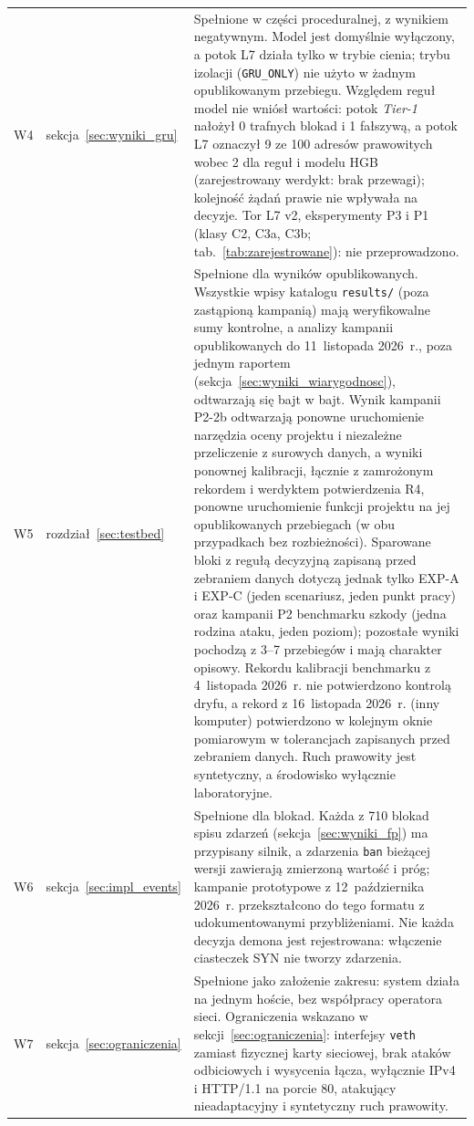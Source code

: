 \documentclass[a4paper,12pt]{article}
\begin{document}
\begin{longtable}{@{}L{0.8cm}L{2.8cm}L{\dimexpr\linewidth-3.6cm-4\tabcolsep\relax}@{}}
W4 & sekcja~\ref{sec:wyniki_gru} & Spełnione w części proceduralnej, z wynikiem negatywnym. Model jest domyślnie wyłączony, a potok L7 działa tylko w trybie cienia; trybu izolacji (\texttt{GRU\_ONLY}) nie użyto w żadnym opublikowanym przebiegu. Względem reguł model nie wniósł wartości: potok \textit{Tier-1} nałożył 0 trafnych blokad i 1 fałszywą, a potok L7 oznaczył 9 ze 100 adresów prawowitych wobec 2 dla reguł i modelu HGB (zarejestrowany werdykt: brak przewagi); kolejność żądań prawie nie wpływała na decyzje. Tor L7 v2, eksperymenty P3 i P1 (klasy C2, C3a, C3b; tab.~\ref{tab:zarejestrowane}): nie przeprowadzono. \\
W5 & rozdział~\ref{sec:testbed} & Spełnione dla wyników opublikowanych. Wszystkie wpisy katalogu \texttt{results/} (poza zastąpioną kampanią) mają weryfikowalne sumy kontrolne, a analizy kampanii opublikowanych do 11~listopada 2026~r., poza jednym raportem (sekcja~\ref{sec:wyniki_wiarygodnosc}), odtwarzają się bajt w bajt. Wynik kampanii P2-2b odtwarzają ponowne uruchomienie narzędzia oceny projektu i niezależne przeliczenie z surowych danych, a wyniki ponownej kalibracji, łącznie z zamrożonym rekordem i werdyktem potwierdzenia R4, ponowne uruchomienie funkcji projektu na jej opublikowanych przebiegach (w obu przypadkach bez rozbieżności). Sparowane bloki z regułą decyzyjną zapisaną przed zebraniem danych dotyczą jednak tylko EXP-A i EXP-C (jeden scenariusz, jeden punkt pracy) oraz kampanii P2 benchmarku szkody (jedna rodzina ataku, jeden poziom); pozostałe wyniki pochodzą z 3--7 przebiegów i mają charakter opisowy. Rekordu kalibracji benchmarku z 4~listopada 2026~r. nie potwierdzono kontrolą dryfu, a rekord z 16~listopada 2026~r. (inny komputer) potwierdzono w kolejnym oknie pomiarowym w tolerancjach zapisanych przed zebraniem danych. Ruch prawowity jest syntetyczny, a środowisko wyłącznie laboratoryjne. \\
W6 & sekcja~\ref{sec:impl_events} & Spełnione dla blokad. Każda z 710 blokad spisu zdarzeń (sekcja~\ref{sec:wyniki_fp}) ma przypisany silnik, a zdarzenia \texttt{ban} bieżącej wersji zawierają zmierzoną wartość i próg; kampanie prototypowe z 12~października 2026~r. przekształcono do tego formatu z udokumentowanymi przybliżeniami. Nie każda decyzja demona jest rejestrowana: włączenie ciasteczek SYN nie tworzy zdarzenia. \\
W7 & sekcja~\ref{sec:ograniczenia} & Spełnione jako założenie zakresu: system działa na jednym hoście, bez współpracy operatora sieci. Ograniczenia wskazano w sekcji~\ref{sec:ograniczenia}: interfejsy \texttt{veth} zamiast fizycznej karty sieciowej, brak ataków odbiciowych i wysycenia łącza, wyłącznie IPv4 i HTTP/1.1 na porcie 80, atakujący nieadaptacyjny i syntetyczny ruch prawowity. \\
\bottomrule
\end{longtable}
\endgroup
\end{document}
